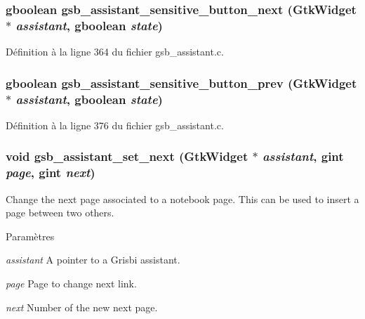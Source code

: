 \subsubsection[{gsb\_\-assistant\_\-sensitive\_\-button\_\-next}]{\setlength{\rightskip}{0pt plus 5cm}gboolean gsb\_\-assistant\_\-sensitive\_\-button\_\-next (GtkWidget $\ast$ {\em assistant}, \/  gboolean {\em state})}\label{gsb__assistant_8c_ad38c5d761d97d2257a4b35a52c4048c6}


Définition à la ligne 364 du fichier gsb\_\-assistant.c.

\subsubsection[{gsb\_\-assistant\_\-sensitive\_\-button\_\-prev}]{\setlength{\rightskip}{0pt plus 5cm}gboolean gsb\_\-assistant\_\-sensitive\_\-button\_\-prev (GtkWidget $\ast$ {\em assistant}, \/  gboolean {\em state})}\label{gsb__assistant_8c_ae21578dcc45348d3400059b9c6794252}


Définition à la ligne 376 du fichier gsb\_\-assistant.c.

\subsubsection[{gsb\_\-assistant\_\-set\_\-next}]{\setlength{\rightskip}{0pt plus 5cm}void gsb\_\-assistant\_\-set\_\-next (GtkWidget $\ast$ {\em assistant}, \/  gint {\em page}, \/  gint {\em next})}\label{gsb__assistant_8c_a06ff0b5745a3a4bd14ceecbd56cd09c1}
Change the next page associated to a notebook page. This can be used to insert a page between two others.


\begin{DoxyParams}{Paramètres}
\item[{\em assistant}]A pointer to a Grisbi assistant. \item[{\em page}]Page to change next link. \item[{\em next}]Number of the new next page. \end{DoxyParams}


